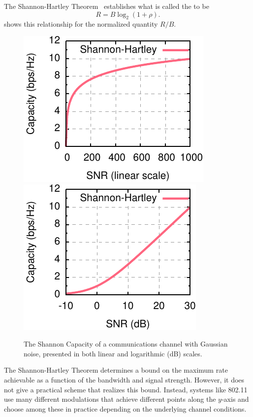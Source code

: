 The Shannon-Hartley Theorem~\cite{Shannon_capacity} establishes what is called the  to be
\begin{equation}
\label{eq:shannon_capacity}
R = B\log_2(1+\rho).
\end{equation}
 shows this relationship for the normalized quantity $R/B$.

\begin{figure}[tb]
\centering
\includegraphics{figures/background/shannon.pdf}\hspace{0.65in}\includegraphics{figures/background/shannon_log.pdf}\hspace{0.1in}
\caption[The Shannon Capacity of a communications channel with Gaussian noise]{\label{fig:shannon}The Shannon Capacity of a communications channel with Gaussian noise, presented in both linear and logarithmic (dB) scales.}
\end{figure}

The Shannon-Hartley Theorem determines a bound on the maximum rate achievable as a function of the bandwidth and signal strength. However, it does not give a practical scheme that realizes this bound. Instead, systems like 802.11 use many different modulations that achieve different points along the $y$-axis and choose among these in practice depending on the underlying channel conditions.

